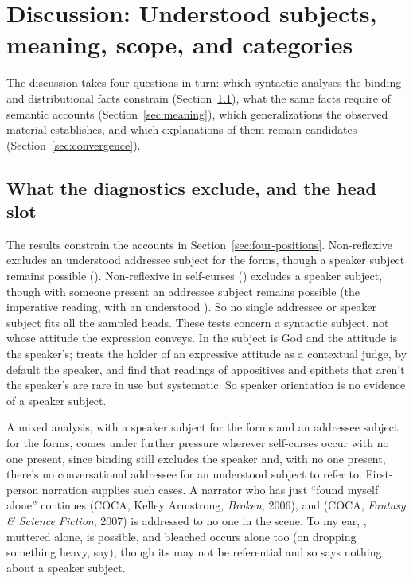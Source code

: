 \documentclass[12pt]{article}
\begin{document}
\section{Discussion: Understood subjects, meaning, scope, and categories}
\label{sec:discussion}

The discussion takes four questions in turn: which syntactic analyses the binding and distributional facts constrain (Section~\ref{sec:ruled-out}), what the same facts require of semantic accounts (Section~\ref{sec:meaning}), which generalizations the observed material establishes, and which explanations of them remain candidates (Section~\ref{sec:convergence}).

\subsection{What the diagnostics exclude, and the head slot}
\label{sec:ruled-out}

The results constrain the accounts in Section~\ref{sec:four-positions}. Non-reflexive  excludes an understood addressee subject for the  forms, though a speaker subject remains possible (). Non-reflexive  in self-curses () excludes a speaker subject, though with someone present an addressee subject remains possible (the imperative reading, with an understood ). So no single addressee or speaker subject fits all the sampled heads. These tests concern a syntactic subject, not whose attitude the expression conveys. In  the subject is God and the attitude is the speaker's; \textcite[173--175]{potts2007} treats the holder of an expressive attitude as a contextual judge, by default the speaker, and \textcite{harrispotts2009} find that readings of appositives and epithets that aren't the speaker's are rare in use but systematic. So speaker orientation is no evidence of a speaker subject.

A mixed analysis, with a speaker subject for the  forms and an addressee subject for the  forms, comes under further pressure wherever self-curses occur with no one present, since binding still excludes the speaker and, with no one present, there's no conversational addressee for an understood subject to refer to. First-person narration supplies such cases. A narrator who has just \enquote{found myself alone} continues  (COCA, Kelley Armstrong, \emph{Broken}, 2006), and  (COCA, \emph{Fantasy \& Science Fiction}, 2007) is addressed to no one in the scene. To my ear, , muttered alone, is possible, and bleached  occurs alone too (on dropping something heavy, say), though its  may not be referential and so says nothing about a speaker subject.
\end{document}
